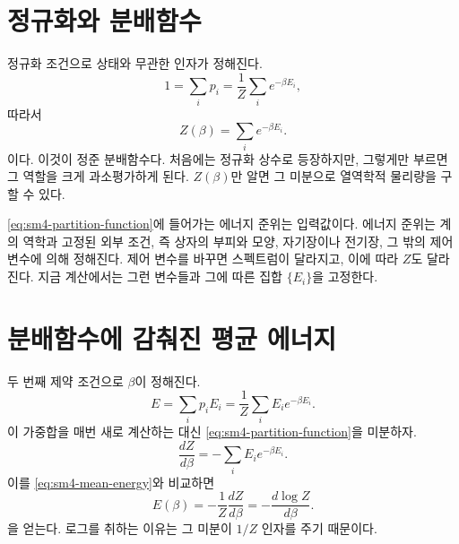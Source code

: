 \section{정규화와 분배함수}

정규화 조건으로 상태와 무관한 인자가 정해진다. \begin{equation}
 1=\sum_i p_i
 =\frac{1}{Z}\sum_i e^{-\beta E_i},
\end{equation}따라서 \begin{equation}
 Z(\beta)=\sum_i e^{-\beta E_i}.
 \label{eq:sm4-partition-function}
\end{equation}이다. 이것이 정준 분배함수다. 처음에는 정규화 상수로 등장하지만, 그렇게만 부르면 그 역할을 크게 과소평가하게 된다. \(Z(\beta)\)만 알면 그 미분으로 열역학적 물리량을 구할 수 있다.

\eqref{eq:sm4-partition-function}에 들어가는 에너지 준위는 입력값이다. 에너지 준위는 계의 역학과 고정된 외부 조건, 즉 상자의 부피와 모양, 자기장이나 전기장, 그 밖의 제어 변수에 의해 정해진다. 제어 변수를 바꾸면 스펙트럼이 달라지고, 이에 따라 \(Z\)도 달라진다. 지금 계산에서는 그런 변수들과 그에 따른 집합 \(\{E_i\}\)을 고정한다.

\begin{classroomqa}\end{classroomqa}

\section{분배함수에 감춰진 평균 에너지}

두 번째 제약 조건으로 \(\beta\)이 정해진다. \begin{equation}
 E=\sum_i p_iE_i
 =\frac{1}{Z}\sum_i E_i e^{-\beta E_i}.
 \label{eq:sm4-mean-energy}
\end{equation}이 가중합을 매번 새로 계산하는 대신 \eqref{eq:sm4-partition-function}을 미분하자. \begin{equation}
 \frac{dZ}{d\beta}
 =-\sum_i E_i e^{-\beta E_i}.
\end{equation}이를 \eqref{eq:sm4-mean-energy}와 비교하면 \begin{equation}
 E(\beta)
 =-\frac{1}{Z}\frac{dZ}{d\beta}
 =-\frac{d\log Z}{d\beta}.
 \label{eq:sm4-energy-logz}
\end{equation}을 얻는다. 로그를 취하는 이유는 그 미분이 \(1/Z\) 인자를 주기 때문이다.


